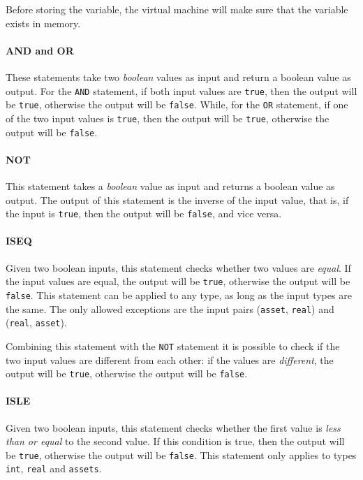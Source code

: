 Before storing the variable, the virtual machine will make sure that the variable exists in memory.

\paragraph{AND and OR}

These statements take two \textit{boolean} values as input and return a boolean value as output. For the 
\verb|AND| statement, if both input values are \verb|true|, then the output will be \verb|true|, otherwise 
the output will be \verb|false|. While, for the \verb|OR| statement, if one of the two input values is 
\verb|true|, then the output will be \verb|true|, otherwise the output will be \verb|false|.

\paragraph{NOT}

This statement takes a \textit{boolean} value as input and returns a boolean value as output. The output 
of this statement is the inverse of the input value, that is, if the input is \verb|true|, then the output 
will be \verb|false|, and vice versa.

\paragraph{ISEQ}

Given two boolean inputs, this statement checks whether two values are \textit{equal}. If the input values 
are equal, the output will be \verb|true|, otherwise the output will be \verb|false|. This statement can 
be applied to any type, as long as the input types are the same. The only allowed exceptions are the input 
pairs (\verb|asset|, \verb|real|) and (\verb|real|, \verb|asset|).

Combining this statement with the \verb|NOT| statement it is possible to check if the two input values are 
different from each other: if the values are \textit{different}, the output will be \verb|true|, otherwise 
the output will be \verb|false|.

\paragraph{ISLE}

Given two boolean inputs, this statement checks whether the first value is \textit{less than or equal} to 
the second value. If this condition is true, then the output will be \verb|true|, otherwise the output 
will be \verb|false|. This statement only applies to types \verb|int|, \verb|real| and \verb|assets|.

